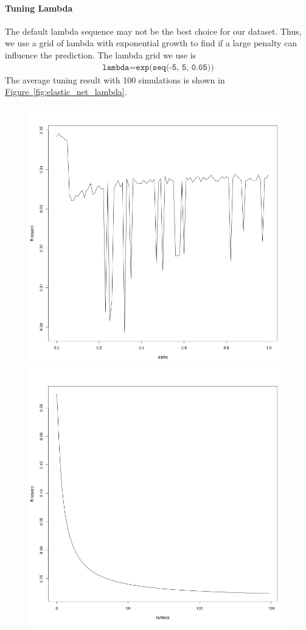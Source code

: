 \documentclass[8pt]{report}
\begin{document}
\paragraph{Tuning Lambda}
The default lambda sequence may not be the best choice for our dataset.
Thus, we use a grid of lambda with exponential growth to find 
if a large penalty can influence the prediction. The lambda grid we use is 
\begin{align*}
    \texttt{lambda} = \texttt{exp(seq(-5, 5, 0.05))}
\end{align*}
The average tuning result with 100 simulations is shown in \hyperref[fig:elastic_net_lambda]{Figure~\ref*{fig:elastic_net_lambda}}.
\begin{figure}[H]
    \centering
    \includegraphics*[scale=0.25]{figures/elastic_net.png}
    \includegraphics*[scale=0.25]{figures/lambda.png}

\end{figure}
\end{document}

